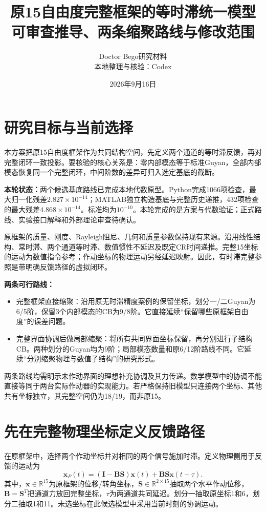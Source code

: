 \documentclass[UTF8,11pt,a4paper]{ctexart}
\title{原15自由度完整框架的等时滞统一模型\\[5pt]\large 可审查推导、两条缩聚路线与修改范围}
\author{Doctor Bego研究材料\\本地整理与核验：Codex}
\date{2026年9月16日}
\newcommand{\mat}[1]{\bm{#1}}
\begin{document}
\maketitle

\section{研究目标与当前选择}

本方案把原15自由度框架作为共同结构空间，先定义两个通道的等时滞反馈，再对完整闭环一致投影。要核验的核心关系是：零内部模态等于标准Guyan，全部内部模态恢复同一个完整闭环，中间阶数的差异可归入选定基底的截断。

\textbf{本轮状态：}两个候选基底路线已完成本地代数原型。Python完成1066项检查，最大归一化残差$2.827\times10^{-14}$；MATLAB独立构造基底与完整历史递推，432项检查的最大残差$4.868\times10^{-14}$。标准均为$10^{-10}$。本轮完成的是方案与代数验证；正式路线、实验接口解释和外部理论审查待确认。

原框架的质量、刚度、Rayleigh阻尼、几何和质量参数保持现有来源。沿用线性结构、常时滞、两个通道等时滞、数值惯性不延迟及既定CR时间递推。完整15坐标的运动为数值指令参考；作动坐标的物理运动另经延迟映射。因此，有时滞完整参照是带明确反馈路径的虚拟闭环。

\textbf{两条可行路线：}
\begin{itemize}
\item 完整框架直接缩聚：沿用原无时滞精度案例的保留坐标，划分一/二Guyan为6/5阶，保留3个内部模态的CB为9/8阶。它直接延续“保留哪些原框架自由度”的误差问题。
\item 完整界面协调后做局部缩聚：将所有共同界面坐标保留，再分别进行子结构CB。两种划分的Guyan均为9阶；局部模态数量和原6/12阶路线不同。它延续“分别缩聚物理与数值子结构”的研究形式。
\end{itemize}

两条路线均需明示未作动界面的理想补充协调及其力传递。数学模型中的协调不能直接等同于两台实际作动器的实现能力。若严格保持旧模型只连接两个坐标、其他共有坐标独立，其完整空间仍为18/19，而非原15。

\section{先在完整物理坐标定义反馈路径}

在原框架中，选择两个作动坐标并对相同的两个信号施加时滞。定义物理侧用于反馈的运动为
\begin{equation}\label{eq:motion}
 \mat x_P(t)=(\mat I-\mat B\mat S)\mat x(t)+\mat B\mat S\mat x(t-\tau).
\end{equation}
其中，$\mat x\in\mathbb R^{15}$为原框架的位移/转角坐标，$\mat S\in\mathbb R^{2\times15}$抽取两个水平作动位移，$\mat B=\mat S^T$把通道力放回完整坐标，$\tau$为两通道共同延迟。划分一抽取原坐标1和6，划分二抽取1和11。未选坐标在此候选模型中采用当前时刻的协调运动。
\end{document}
